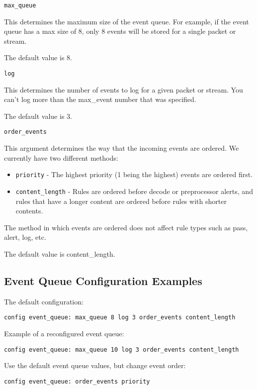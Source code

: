 \documentclass[english]{report}
\newcounter{slistnum}
\newenvironment{slist}
{ \begin{list}{ {\bf \arabic{slistnum}.} }{\usecounter{slistnum} } }
{ \end{list} }
\begin{document}
\begin{slist}
\item \texttt{max\_queue}

This determines the maximum size of the event queue.  For example, if the
event queue has a max size of 8, only 8 events will be stored for a single
packet or stream.

The default value is 8.

\item \texttt{log}

This determines the number of events to log for a given packet or stream.
You can't log more than the max\_event number that was specified.

The default value is 3.

\item \texttt{order\_events}

This argument determines the way that the incoming events are ordered.  We
currently have two different methods:

\begin{itemize}
  \item \texttt{priority} - The highest priority (1 being the highest) events are ordered
    first.

  \item \texttt{content\_length} - Rules are ordered before decode or preprocessor alerts,
    and rules that have a longer content are ordered before rules with
    shorter contents.
\end{itemize}

The method in which events are ordered does not affect rule types such as
pass, alert, log, etc.

The default value is content\_length.
\end{slist}
\subsection{Event Queue Configuration Examples}

The default configuration:
\begin{verbatim}
config event_queue: max_queue 8 log 3 order_events content_length
\end{verbatim}

Example of a reconfigured event queue:
\begin{verbatim}
config event_queue: max_queue 10 log 3 order_events content_length
\end{verbatim}

Use the default event queue values, but change event order:
\begin{verbatim}
config event_queue: order_events priority
\end{verbatim}
\end{document}

